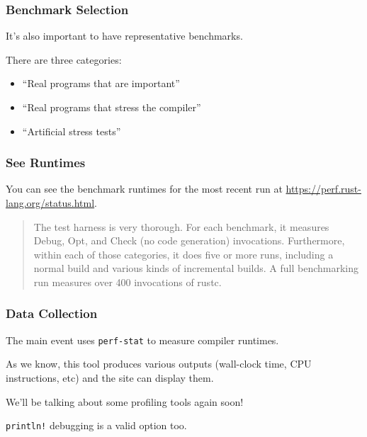 \begin{frame}
\frametitle{Benchmark Selection}

It's also important to have representative benchmarks. 

There are three categories:\\
\begin{itemize}
	\item ``Real programs that are important'' 
	\item ``Real programs that stress the compiler''
	\item ``Artificial stress tests''
\end{itemize}

\end{frame}


\begin{frame}
\frametitle{See Runtimes}
You can see the benchmark runtimes for the most recent run at \url{https://perf.rust-lang.org/status.html}.

\begin{quote}
The test harness is very thorough. For each benchmark, it measures Debug, Opt, and Check (no code generation) invocations. Furthermore, within each of those categories, it does five or more runs, including a normal build and various kinds of incremental builds. A full benchmarking run measures over 400 invocations of rustc.
\end{quote}


\end{frame}

\begin{frame}
\frametitle{Data Collection}

The main event uses \texttt{perf-stat} to measure compiler runtimes.

As we know, this tool produces various outputs (wall-clock time, CPU
instructions, etc) and the site can display them.

We'll be talking about some profiling tools again soon!

\texttt{println!} debugging is a valid option too. 

\end{frame}


